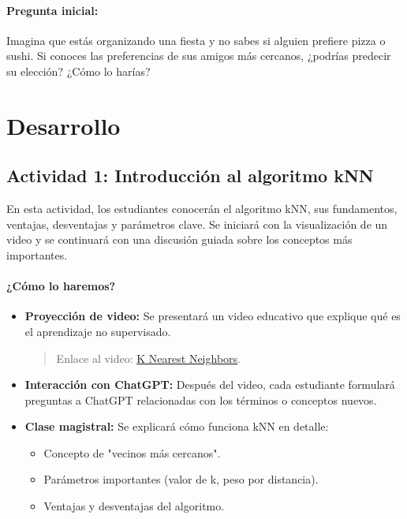 \documentclass[a4,11pt]{aleph-notas}
\begin{document}
\paragraph{Pregunta inicial:} 
Imagina que estás organizando una fiesta y no sabes si alguien prefiere pizza o sushi. Si conoces las preferencias de sus amigos más cercanos, ¿podrías predecir su elección? ¿Cómo lo harías?

\section*{Desarrollo}

\subsection*{Actividad 1: Introducción al algoritmo kNN}

En esta actividad, los estudiantes conocerán el algoritmo kNN, sus fundamentos, ventajas, desventajas y parámetros clave. Se iniciará con la visualización de un video y se continuará con una discusión guiada sobre los conceptos más importantes.

\paragraph{¿Cómo lo haremos?}  
\begin{itemize}[leftmargin=*]
    \item \textbf{Proyección de video:}  
    Se presentará un video educativo que explique qué es el aprendizaje no supervisado.
    \begin{quote}
        Enlace al video: \href{https://www.youtube.com/watch?v=0p0o5cmgLdE}{K Nearest Neighbors}.
    \end{quote}
    \item \textbf{Interacción con ChatGPT:}  
    Después del video, cada estudiante formulará preguntas a ChatGPT relacionadas con los términos o conceptos nuevos.
    \item \textbf{Clase magistral:} Se explicará cómo funciona kNN en detalle: 
        \begin{itemize}
            \item Concepto de "vecinos más cercanos".
            \item Parámetros importantes (valor de k, peso por distancia).
            \item Ventajas y desventajas del algoritmo.
        \end{itemize}
\end{itemize}
\end{document}
